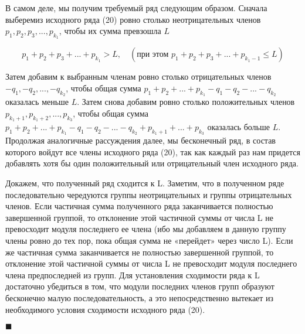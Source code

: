 В самом деле, мы получим требуемый ряд следующим образом. Сначала выберемиз исходного ряда (20) ровно столько неотрицательных членов $p_1, p_2, p_3, ..., p_{k_1}$, чтобы их сумма превзошла $L$

\begin{equation*}
	p_1 + p_2 + p_3 + ... + p_{k_1} > L,\quad (\mbox{при этом } p_1 + p_2 + p_3 + ... + p_{k_1 - 1} \leqslant L)
\end{equation*}

Затем добавим к выбранным членам ровно столько отрицательных членов $-q_1, -q_2, ..., -q_{k_2}$, чтобы общая сумма $p_1 + p_2 + ... + p_{k_1} - q_1 - q_2 - ... - q_{k_2}$  оказалась меньше $L$. Затем снова добавим ровно столько положительных членов $p_{k_1 + 1}, p_{k_1 + 2}, ..., p_{k_3}$, чтобы общая сумма $p_1 + p_2 + ... + p_{k_1} - q_1 - q_2 - ... - q_{k_2} + p_{k_1 + 1} + ... + p_{k_3}$ оказалась больше $L$. Продолжая аналогичные рассуждения далее, мы бесконечный ряд, в состав которого войдут все члены исходного ряда (20), так как каждый раз нам придется добавлять хотя бы один положительный или отрицательный член исходного ряда.

Докажем, что полученный ряд сходится к L. Заметим, что в полученном ряде последовательно чередуются группы неотрицательных и группы отрицательных членов. Если частичная сумма полученного ряда заканчивается полностью завершенной группой, то отклонение этой частичной суммы от числа L не превосходит модуля последнего ее члена (ибо мы добавляем в данную группу члены ровно до тех пор, пока общая сумма не «перейдет» через число L). Если же частичная сумма заканчивается не полностью завершенной группой, то отклонение этой частичной суммы от числа L не превосходит модуля последнего члена предпоследней из групп. Для установления сходимости ряда к L достаточно убедиться в том, что модули последних членов групп образуют бесконечно малую последовательность, а это непосредственно вытекает из необходимого условия сходимости исходного ряда (20).

\begin{flushright}
	$\blacksquare$
\end{flushright}